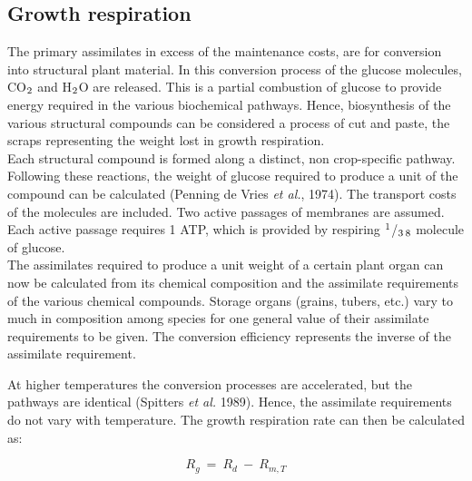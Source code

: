 \subsection{Growth respiration  }

The primary assimilates in excess of the maintenance costs, are for conversion into
structural plant material. In this conversion process of the glucose molecules, CO$_{{\rm 2}}$ and
H$_{{\rm 2}}$O are released. This is a partial combustion of glucose to provide energy required in
the various biochemical pathways. Hence, biosynthesis of the various structural com\-pounds can be considered a process of cut and paste, the scraps representing the weight
lost in growth respiration.\\
 Each structural compound is formed along a distinct, non crop-specific pathway.
Following these reactions, the weight of glucose required to produce a unit of the
compound can be calculated (Penning de Vries {\it et al.\/}, 1974). The transport costs of the
molecules are included. Two active passages of membranes are assumed. Each active
passage requires 1 ATP, which is provided by respiring $^{{\rm 1}}$/$_{{\rm 3}}$$_{{\rm 8}}$ molecule of glucose. \\
The assimilates required to produce a unit weight of a certain plant organ can now be
calculated from its chemical composition and the assimilate requirements of the various
chemical com\-pounds. Storage organs (grains, tubers, etc.) vary to much in composition
among species for one general value of their assimilate requirements to be given. The
conversion efficiency represents the inverse of the assimilate require\-ment.

At higher temperatures the conversion processes are accelerated, but the pathways are
identical (Spitters {\it et al.\/} 1989). Hence, the assimilate requirements do not vary with
temperature. The growth respiration rate can then be calculated as:

\begin{displaymath}
R _{g} ~=~ R _{d} ~-~ R _{m,T} 
\end{displaymath}

